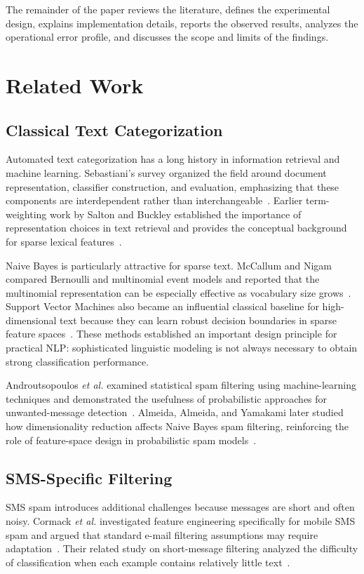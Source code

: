\documentclass[conference]{IEEEtran}
\begin{document}
The remainder of the paper reviews the literature, defines the experimental design, explains implementation details, reports the observed results, analyzes the operational error profile, and discusses the scope and limits of the findings.

\section{Related Work}
\subsection{Classical Text Categorization}
Automated text categorization has a long history in information retrieval and machine learning. Sebastiani's survey organized the field around document representation, classifier construction, and evaluation, emphasizing that these components are interdependent rather than interchangeable~\cite{sebastiani2002ml}. Earlier term-weighting work by Salton and Buckley established the importance of representation choices in text retrieval and provides the conceptual background for sparse lexical features~\cite{salton1988term}.

Naive Bayes is particularly attractive for sparse text. McCallum and Nigam compared Bernoulli and multinomial event models and reported that the multinomial representation can be especially effective as vocabulary size grows~\cite{mccallum1998nb}. Support Vector Machines also became an influential classical baseline for high-dimensional text because they can learn robust decision boundaries in sparse feature spaces~\cite{joachims1998svm}. These methods established an important design principle for practical NLP: sophisticated linguistic modeling is not always necessary to obtain strong classification performance.

Androutsopoulos \textit{et al.} examined statistical spam filtering using machine-learning techniques and demonstrated the usefulness of probabilistic approaches for unwanted-message detection~\cite{androutsopoulos2000spam}. Almeida, Almeida, and Yamakami later studied how dimensionality reduction affects Naive Bayes spam filtering, reinforcing the role of feature-space design in probabilistic spam models~\cite{almeida2011dim}.

\subsection{SMS-Specific Filtering}
SMS spam introduces additional challenges because messages are short and often noisy. Cormack \textit{et al.} investigated feature engineering specifically for mobile SMS spam and argued that standard e-mail filtering assumptions may require adaptation~\cite{cormack2007feature}. Their related study on short-message filtering analyzed the difficulty of classification when each example contains relatively little text~\cite{cormack2007spam}.
\end{document}
